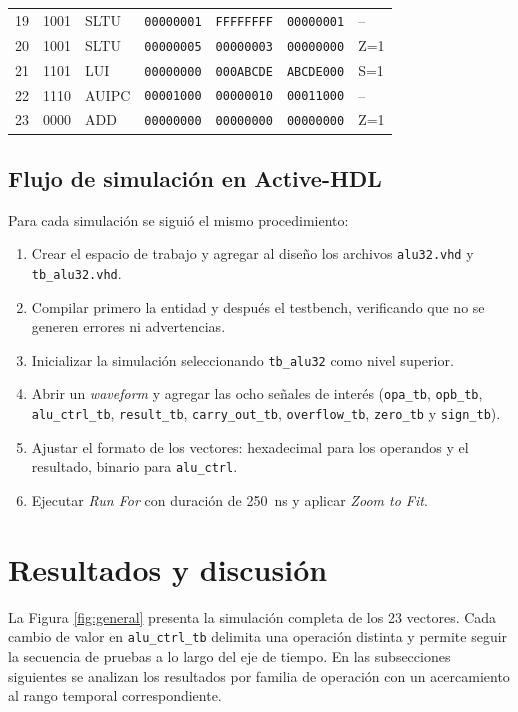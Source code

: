 \documentclass[12pt,letterpaper]{article}
\begin{document}
\begin{table}[H]
\begin{tabular}{C{0.7cm}C{1.3cm}C{1.6cm}C{2cm}C{2cm}C{2cm}C{2.6cm}}
19 & 1001 & SLTU  & \texttt{00000001} & \texttt{FFFFFFFF} & \texttt{00000001} & --\\
20 & 1001 & SLTU  & \texttt{00000005} & \texttt{00000003} & \texttt{00000000} & Z=1\\
21 & 1101 & LUI   & \texttt{00000000} & \texttt{000ABCDE} & \texttt{ABCDE000} & S=1\\
22 & 1110 & AUIPC & \texttt{00001000} & \texttt{00000010} & \texttt{00011000} & --\\
23 & 0000 & ADD   & \texttt{00000000} & \texttt{00000000} & \texttt{00000000} & Z=1\\
\bottomrule
\end{tabular}
\end{table}

\subsection{Flujo de simulación en Active-HDL}
Para cada simulación se siguió el mismo procedimiento:
\begin{enumerate}
  \item Crear el espacio de trabajo y agregar al diseño los archivos \texttt{alu32.vhd} y \texttt{tb\_alu32.vhd}.
  \item Compilar primero la entidad y después el testbench, verificando que no se generen errores ni advertencias.
  \item Inicializar la simulación seleccionando \texttt{tb\_alu32} como nivel superior.
  \item Abrir un \textit{waveform} y agregar las ocho señales de interés (\texttt{opa\_tb}, \texttt{opb\_tb}, \texttt{alu\_ctrl\_tb}, \texttt{result\_tb}, \texttt{carry\_out\_tb}, \texttt{overflow\_tb}, \texttt{zero\_tb} y \texttt{sign\_tb}).
  \item Ajustar el formato de los vectores: hexadecimal para los operandos y el resultado, binario para \texttt{alu\_ctrl}.
  \item Ejecutar \textit{Run For} con duración de \SI{250}{\nano\second} y aplicar \textit{Zoom to Fit}.
\end{enumerate}

\section{Resultados y discusión}
La Figura \ref{fig:general} presenta la simulación completa de los 23 vectores. Cada cambio de valor en \texttt{alu\_ctrl\_tb} delimita una operación distinta y permite seguir la secuencia de pruebas a lo largo del eje de tiempo. En las subsecciones siguientes se analizan los resultados por familia de operación con un acercamiento al rango temporal correspondiente.
\end{document}
